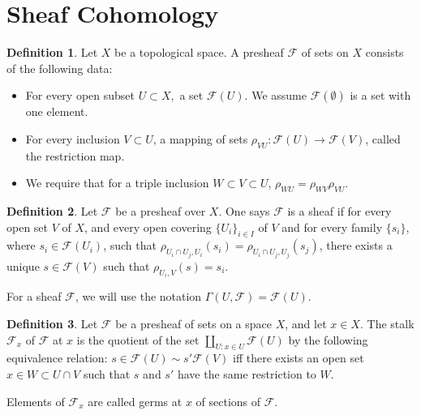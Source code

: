 \documentclass{article}
\theoremstyle{definition}
\newtheorem{defn}{Definition}[section]
\begin{document}
    \section{Sheaf Cohomology}
    \begin{defn}
    Let $X$ be a topological space. A presheaf $\mathcal{F}$ of sets on $X$ consists of the following data:
    \begin{itemize}
    \item For every open subset $U\subset X,$ a set $\mathcal{F}(U).$ We assume $\mathcal{F}(\emptyset)$ is a set with one element. 
    \item For every inclusion $V\subset U$, a mapping of sets $\rho_{VU}:\mathcal{F}(U)\rightarrow\mathcal{F}(V)$, called the restriction map.
    \item We require that for a triple inclusion $W\subset V\subset U$, $\rho_{WU}=\rho_{WV}\rho_{VU}.$
    \end{itemize}
    \end{defn}
    
    \begin{defn}
    Let $\mathcal{F}$ be a presheaf over $X$. One says $\mathcal{F}$ is a sheaf if for every open set $V$ of $X$, and every open covering $\{U_{i}\}_{i\in I}$ of $V$ and for every family $\{s_{i}\}$, where $s_{i}\in\mathcal{F}(U_{i})$, such that $\rho_{U_{i}\cap U_{j},U_{i}}(s_{i})=\rho_{U_{i}\cap U_{j},U_{j}}(s_{j})$, there exists a unique $s\in\mathcal{F}(V)$ such that $\rho_{U_{i},V}(s)=s_{i}.$
    \end{defn}
    
    For a sheaf $\mathcal{F}$, we will use the notation $\Gamma(U,\mathcal{F})=\mathcal{F}(U).$
    
    \begin{defn}
    Let $\mathcal{F}$ be a presheaf of sets on a space $X$, and let $x\in X.$ The stalk $\mathcal{F}_{x}$ of $\mathcal{F}$ at $x$ is the quotient of the set $\amalg_{U:x\in U}\mathcal{F}(U)$ by the following equivalence relation: $s\in\mathcal{F}(U)\sim s'\mathcal{F}(V)$ iff there exists an open set $x\in W\subset U\cap V$ such that $s$ and $s'$ have the same restriction to $W$.
    \end{defn}
    Elements of $\mathcal{F}_{x}$ are called germs at $x$ of sections of $\mathcal{F}$.
    
    
\end{document}
